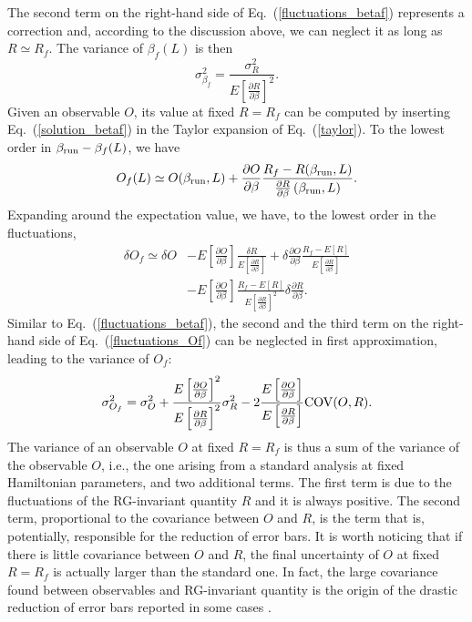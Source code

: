 \documentclass[pre,twocolumn]{revtex4-2}
\begin{document}
The second term on the right-hand side of Eq.~(\ref{fluctuations_betaf}) represents a correction and, according to the discussion above, we can neglect it as long as $R\simeq R_f$.
The variance of $\beta_f(L)$ is then
\begin{equation}
  \sigma_{\beta_f}^2 = \frac{\sigma_R^2}{E\left[\frac{\partial R}{\partial \beta}\right]^2}.
  \label{var_betaf}
\end{equation}
Given an observable $O$, its value at fixed $R=R_f$ can be computed by inserting Eq.~(\ref{solution_betaf}) in the Taylor expansion of Eq.~(\ref{taylor}). To the lowest order in $\beta_{\rm run}-\beta_f(L)$, we have
\begin{equation}
  O_f(L) \simeq O(\beta_{\rm run}, L) + \frac{\partial O}{\partial\beta}\frac{R_f - R(\beta_{\rm run}, L)}{\frac{\partial R}{\partial \beta}\left(\beta_{\rm run}, L\right)}.
  \label{solution_O_fixedR}
\end{equation}
Expanding around the expectation value, we have, to the lowest order in the fluctuations,
\begin{equation}
  \begin{split}
    \delta O_f \simeq \delta O &- E\left[\frac{\partial O}{\partial\beta}\right] \frac{\delta R}{E\left[\frac{\partial R}{\partial \beta}\right]}
    +\delta \frac{\partial O}{\partial\beta}\frac{R_f - E\left[R\right]}{E\left[\frac{\partial R}{\partial \beta}\right]} \\
    & - E\left[\frac{\partial O}{\partial\beta}\right]\frac{R_f - E\left[R\right]}{E\left[\frac{\partial R}{\partial \beta}\right]^2}\delta\frac{\partial R}{\partial \beta}.
  \end{split}
  \label{fluctuations_Of}
\end{equation}
Similar to Eq.~(\ref{fluctuations_betaf}), the second and the third term on the right-hand side of Eq.~(\ref{fluctuations_Of}) can be neglected in first approximation, leading to the variance of $O_f$:
\begin{equation}
  \sigma_{O_f}^2 = \sigma_{O}^2 + \frac{E\left[\frac{\partial O}{\partial\beta}\right]^2}{E\left[\frac{\partial R}{\partial \beta}\right]^2}\sigma_R^2 - 2 \frac{E\left[\frac{\partial O}{\partial\beta}\right]}{E\left[\frac{\partial R}{\partial \beta}\right]}{\rm COV}(O, R).
  \label{var_Of}
\end{equation}
The variance of an observable $O$ at fixed $R=R_f$ is thus a sum of the variance of the observable $O$, i.e., the one arising from a standard analysis at fixed Hamiltonian parameters, and two additional terms. The first term is due to the fluctuations of the RG-invariant quantity $R$ and it is always positive.
The second term, proportional to the covariance between $O$ and $R$, is the term that is, potentially, responsible for the reduction of error bars.
It is worth noticing that if there is little covariance between $O$ and $R$, the final uncertainty of $O$ at fixed $R=R_f$ is actually larger than the standard one.
In fact, the large covariance found between observables and RG-invariant quantity is the origin of the drastic reduction of error bars reported in some cases \cite{HPTPV-07,PT-11}.
\end{document}
